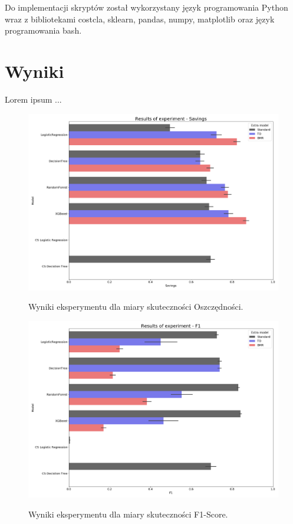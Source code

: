\documentclass{book}
\begin{document}
	Do implementacji skryptów został wykorzystany język programowania Python wraz z bibliotekami costcla, sklearn, pandas, numpy, matplotlib oraz język programowania bash.

\section{Wyniki}
	Lorem ipsum ...
	
	\begin{figure}[h]
		\includegraphics[width=\linewidth]{images/100_config1-Savings.png}
		\label{results-savings}
		\caption{Wyniki eksperymentu dla miary skuteczności Oszczędności.}	
	\end{figure}
	
	\begin{figure}[h]
		\includegraphics[width=\linewidth]{images/100_config1-F1.png}
		\label{results-f1}
		\caption{Wyniki eksperymentu dla miary skuteczności F1-Score.}
	\end{figure}
	
\end{document}
